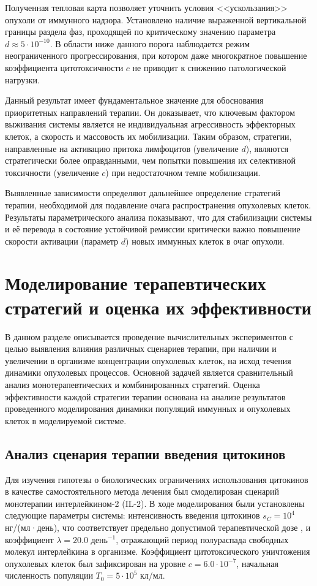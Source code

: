Полученная тепловая карта позволяет уточнить условия <<ускользания>> опухоли
от иммунного надзора. Установлено наличие выраженной вертикальной границы
раздела фаз, проходящей по критическому значению параметра $d \approx 5 \cdot
10^{-10}$. В области ниже данного порога наблюдается режим неограниченного
прогрессирования, при котором даже многократное повышение коэффициента
цитотоксичности $c$ не приводит к снижению патологической нагрузки.

Данный результат имеет фундаментальное значение для обоснования приоритетных
направлений терапии. Он доказывает, что ключевым фактором выживания системы
является не индивидуальная агрессивность эффекторных клеток, а скорость и
массовость их мобилизации. Таким образом, стратегии, направленные на активацию
притока лимфоцитов (увеличение $d$), являются стратегически более оправданными,
чем попытки повышения их селективной токсичности (увеличение $c$) при
недостаточном темпе мобилизации.

Выявленные зависимости определяют дальнейшее определение стратегий терапии,
необходимой для подавление очага распространения опухолевых клеток. Результаты
параметрического анализа показывают, что для стабилизации системы и её перевода
в состояние устойчивой ремиссии критически важно повышение скорости активации
(параметр $d$) новых иммунных клеток в очаг опухоли.

\section{Моделирование терапевтических стратегий и оценка их эффективности}

В данном разделе описывается проведение вычислительных экспериментов с целью
выявления влияния различных сценариев терапии, при наличии и увеличении в
организме концентрации опухолевых клеток, на исход течения динамики опухолевых процессов.
Основной задачей является сравнительный анализ монотерапевтических и
комбинированных стратегий. Оценка эффективности каждой стратегии терапии основана на
анализе результатов проведенного моделирования динамики популяций иммунных и
опухолевых клеток в моделируемой системе.

\subsection{Анализ сценария терапии введения цитокинов}

Для изучения гипотезы о биологических ограничениях использования цитокинов в
качестве самостоятельного метода лечения был смоделирован сценарий монотерапии
интерлейкином-2 (IL-2). В ходе моделирования были установлены следующие параметры системы:
интенсивность введения цитокинов $s_C = 10^4$ нг/(мл·день), что соответствует
предельно допустимой терапевтической дозе \cite{cytokine_dose}, и коэффициент
$\lambda = 20.0$ день$^{-1}$, отражающий период полураспада свободных молекул
интерлейкина в организме. Коэффициент цитотоксического уничтожения опухолевых клеток был
зафиксирован на уровне $c = 6.0 \cdot 10^{-7}$, начальная численность популяции
$T_0 = 5 \cdot 10^5$ кл/мл.


